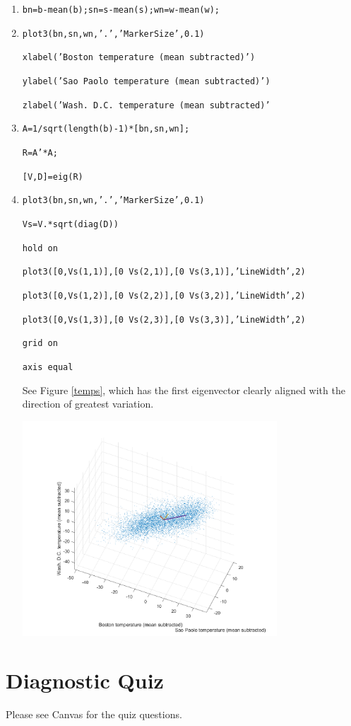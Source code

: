 \begin{sol}
\begin{enumerate}
    \item \texttt{bn=b-mean(b);sn=s-mean(s);wn=w-mean(w);}
    \item \texttt{plot3(bn,sn,wn,'.','MarkerSize',0.1)}

\texttt{xlabel('Boston temperature (mean subtracted)')}

\texttt{ylabel('Sao Paolo temperature (mean subtracted)')}

\texttt{zlabel('Wash. D.C. temperature (mean subtracted)'}
\item \texttt{A=1/sqrt(length(b)-1)*[bn,sn,wn];}

\texttt{R=A'*A;}

\texttt{[V,D]=eig(R)}
\item \texttt{plot3(bn,sn,wn,'.','MarkerSize',0.1)}

\texttt{Vs=V.*sqrt(diag(D))}

\texttt{hold on}

\texttt{plot3([0,Vs(1,1)],[0 Vs(2,1)],[0 Vs(3,1)],'LineWidth',2)}

\texttt{plot3([0,Vs(1,2)],[0 Vs(2,2)],[0 Vs(3,2)],'LineWidth',2)}

\texttt{plot3([0,Vs(1,3)],[0 Vs(2,3)],[0 Vs(3,3)],'LineWidth',2)}

\texttt{grid on}

\texttt{axis equal}

See Figure \ref{temps}, which has the first eigenvector clearly aligned with the direction of greatest variation.

\begin{center}
\includegraphics[width=0.75\textwidth]{FacesNight6/figs/tempplot.png}
\label{temps}
\end{center}
\end{enumerate}
\end{sol}

\section{Diagnostic Quiz}
Please see Canvas for the quiz questions.

\pagebreak
\shipoutAnswer
